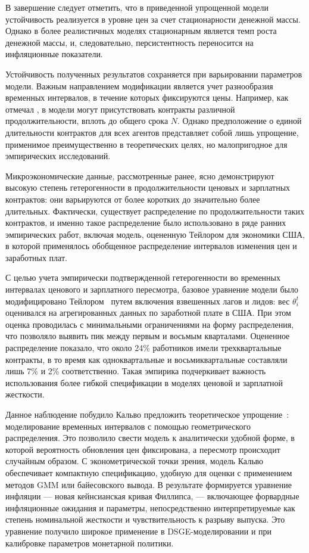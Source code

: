В завершение следует отметить, что в приведенной упрощенной модели устойчивость реализуется в уровне цен за счет стационарности денежной массы. Однако в более реалистичных моделях стационарным является темп роста денежной массы, и, следовательно, персистентность переносится на инфляционные показатели.

Устойчивость полученных результатов сохраняется при варьировании параметров модели. Важным направлением модификации является учет разнообразия временных интервалов, в течение которых фиксируются цены. Например, как отмечал \cite{Taylor1980}, в модели могут
присутствовать контракты различной продолжительности, вплоть до общего срока \( N \). Однако предположение о единой длительности контрактов для всех агентов представляет собой лишь упрощение, применимое преимущественно в теоретических целях, но малопригодное для эмпирических исследований.

Микроэкономические данные, рассмотренные ранее, ясно демонстрируют высокую степень гетерогенности в продолжительности ценовых и зарплатных контрактов: они варьируются от более коротких до значительно более длительных. Фактически, существует распределение по продолжительности таких контрактов, и именно такое распределение было использовано в ряде ранних эмпирических работ, включая модель, оцененную Тейлором
\cite{Taylor1980} для экономики США, в которой применялось обобщенное распределение интервалов изменения цен и заработных плат.

С целью учета эмпирически подтвержденной гетерогенности во временных интервалах ценового и зарплатного пересмотра, базовое уравнение модели было модифицировано Тейлором~\cite{Taylor1980} путем включения взвешенных лагов и лидов: вес \( \theta_i^t \) оценивался на агрегированных данных по заработной плате в США. При этом оценка проводилась с минимальными ограничениями на форму распределения, что позволяло выявить пик между первым и восьмым кварталами. Оцененное распределение показало, что около 24\% работников имели трехквартальные контракты, в то время как одноквартальные и восьмиквартальные составляли лишь 7\% и 2\% соответственно. Такая эмпирика подчеркивает важность использования более гибкой спецификации в моделях ценовой и зарплатной жесткости.

Данное наблюдение побудило Кальво предложить теоретическое упрощение~\cite{Calvo1983}: моделирование временных интервалов с помощью геометрического распределения. Это позволило свести модель к аналитически удобной форме, в которой вероятность обновления цен фиксирована, а пересмотр происходит случайным образом. С эконометрической точки зрения, модель Кальво обеспечивает компактную спецификацию, удобную для оценки с применением методов GMM или байесовского вывода. В результате формируется уравнение инфляции — новая кейнсианская кривая Филлипса, — включающее форвардные инфляционные ожидания и параметры, непосредственно интерпретируемые как степень номинальной жесткости и чувствительность к разрыву выпуска. Это уравнение получило широкое применение в DSGE-моделировании и при калибровке параметров монетарной политики.

